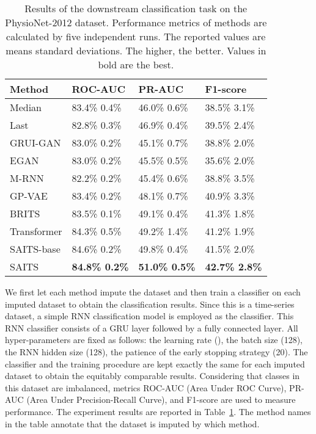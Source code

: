 \documentclass{article}
\begin{document}
\begin{table}[!htb]
	\caption{Results of the downstream classification task on the PhysioNet-2012 dataset. Performance metrics of methods are calculated by five independent runs. The reported values are means  standard deviations. The higher, the better. Values in bold are the best.}
	\label{tb3}
	\centering
	\begin{tabular}{p{70pt}<{\centering}|p{90pt}<{\centering}|p{90pt}<{\centering}|p{90pt}<{\centering}}
		\toprule
		Method     & ROC-AUC           & PR-AUC              & F1-score              \\
		\midrule
		Median     & 83.4\%  0.4\% & 46.0\%  0.6\%  & 38.5\%  3.1\%  \\
		\midrule
		Last       & 82.8\%  0.3\% & 46.9\%  0.4\%  & 39.5\%  2.4\%  \\
		\midrule
		GRUI-GAN   & 83.0\%  0.2\% & 45.1\%  0.7\%  & 38.8\%  2.0\% \\
		\midrule
		EGAN   & 83.0\%  0.2\% & 45.5\%  0.5\%  & 35.6\%  2.0\%  \\
		\midrule
		M-RNN      & 82.2\%  0.2\% & 45.4\%  0.6\%  & 38.8\%  3.5\% \\
		\midrule
		GP-VAE     & 83.4\%  0.2\% & 48.1\%  0.7\%  & 40.9\%  3.3\% \\
		\midrule
		BRITS      & 83.5\%  0.1\% & 49.1\%  0.4\%  & 41.3\%  1.8\% \\
		\midrule
		Transformer& 84.3\%  0.5\% & 49.2\%  1.4\%  & 41.2\%  1.9\% \\
		\midrule
		SAITS-base& 84.6\%  0.2\% & 49.8\%  0.4\% & 41.5\%  2.0\%\vspace{0.5em} \\ 
		SAITS      & \textbf{84.8\%  0.2\%} & \textbf{51.0\%  0.5\%}  & \textbf{42.7\%  2.8\%} \\
		\bottomrule
	\end{tabular}
\end{table}

We first let each method impute the dataset and then train a classifier on each imputed dataset to obtain the classification results. Since this is a time-series dataset, a simple RNN classification model is employed as the classifier. This RNN classifier consists of a GRU layer followed by a fully connected layer. All hyper-parameters are fixed as follows: the learning rate (), the batch size (128), the RNN hidden size (128), the patience of the early stopping strategy (20). The classifier and the training procedure are kept exactly the same for each imputed dataset to obtain the equitably comparable results. Considering that classes in this dataset are imbalanced, metrics ROC-AUC (Area Under ROC Curve), PR-AUC (Area Under Precision-Recall Curve), and F1-score are used to measure performance. The experiment results are reported in Table~\ref{tb3}. The method names in the table annotate that the dataset is imputed by which method. 
\end{document}
